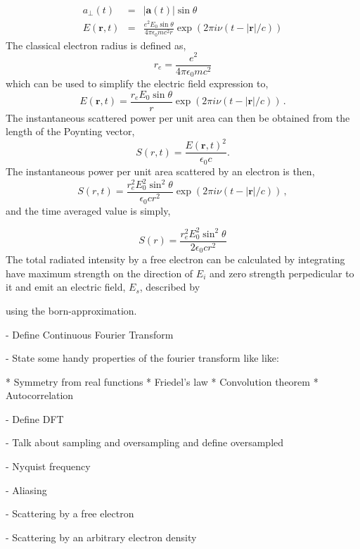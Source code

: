 \begin{eqnarray}
a_{\perp}(t) & = & |\mathbf a(t)| \sin \theta  \\
E(\mathbf r,t) & = & \frac{e^2 E_0 \sin \theta }{4 \pi \epsilon_0 m c^2 r} \exp(2 \pi i \nu (t -| \mathbf r|/c)) 
\label{Eq:scattering_by_electron}
\end{eqnarray}
The classical electron radius is defined as,
\begin{equation}
r_e = \frac{e^2}{4 \pi \epsilon_0 m c^2}
\end{equation}
which can be used to simplify the electric field expression to,
\begin{equation}
E(\mathbf r,t) = \frac{r_e E_0 \sin \theta }{r} \exp(2 \pi i \nu (t -| \mathbf r|/c))  \, .
\end{equation}
The instantaneous scattered power per unit area can then be obtained from the length of the Poynting vector,
\begin{equation} 
S(r,t) = \frac{ E(\mathbf r,t)^2 }{ \epsilon_0 c} .
\label{Eq:poynting_vector}
\end{equation} 
The instantaneous power per unit area scattered by an electron is then,
\begin{equation}
S(r,t)  = \frac{r_e^2 E_0^2 \sin^2 \theta }{\epsilon_0 c r^2} \exp(2 \pi i \nu (t - |\mathbf r|/c)) \, ,
\end{equation}
and the time averaged value is simply,

\begin{equation}
S(r)  = \frac{r_e^2 E_0^2 \sin^2 \theta }{2 \epsilon_0 c r^2}
\end{equation}
The total radiated intensity by a free electron can be calculated by integrating 
have maximum strength on the direction of $E_i$ and zero strength perpedicular
to it
and emit an electric field, $E_s$, described by


using the born-approximation.

- Define Continuous Fourier Transform 

- State some handy properties of the fourier transform like like:

* Symmetry from real functions
* Friedel's law 
* Convolution theorem
* Autocorrelation

- Define DFT

- Talk about sampling and oversampling and define oversampled

- Nyquist frequency

- Aliasing

- Scattering by a free electron

- Scattering by an arbitrary electron density

